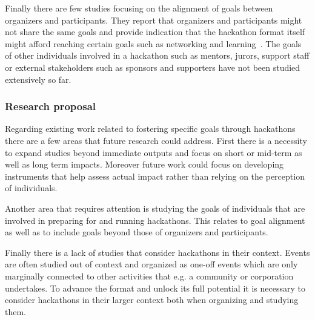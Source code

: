 \documentclass{ieeeaccess}
\begin{document}
Finally there are few studies focusing on the alignment of goals between organizers and participants. 
They report that organizers and participants might not share the same goals and provide indication that the hackathon format itself might afford reaching certain goals such as networking and learning~\cite{medina2019does}.
The goals of other individuals involved in a hackathon such as mentors, jurors, support staff or external stakeholders such as sponsors and supporters have not been studied extensively so far.

\subsubsection{Research proposal}
Regarding existing work related to fostering specific goals through hackathons there are a few areas that future research could address. 
First there is a necessity to expand studies beyond immediate outputs and focus on short or mid-term as well as long term impacts. 
Moreover future work could focus on developing instruments that help assess actual impact rather than relying on the perception of individuals.

Another area that requires attention is studying the goals of individuals that are involved in preparing for and running hackathons. 
This relates to goal alignment as well as to include goals beyond those of organizers and participants.

Finally there is a lack of studies that consider hackathons in their context. 
Events are often studied out of context and organized as one-off events which are only marginally connected to other activities that e.g. a community or corporation undertakes. 
To advance the format and unlock its full potential it is necessary to consider hackathons in their larger context both when organizing and studying them.
\end{document}
